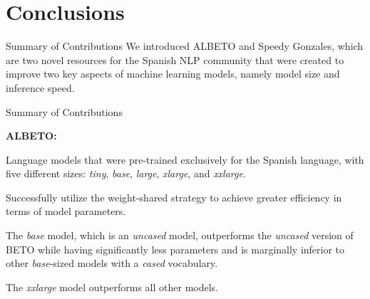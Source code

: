 \documentclass[aspectratio=169,xcolor=dvipsnames]{beamer}
\newenvironment{wideitemize}{\itemize\addtolength{\itemsep}{10pt}}{\enditemize}
\begin{document}




\section{Conclusions}
\begin{frame}{Summary of Contributions}
\centering
\Large{We introduced ALBETO and Speedy Gonzales, which are \alert{two novel resources} for the \alert{Spanish NLP} community that were created to \alert{improve} two key aspects of machine learning models, namely \alert{model size} and \alert{inference speed}.}

\end{frame}
\begin{frame}{Summary of Contributions}

\textbf{ALBETO:}
\begin{wideitemize}
    \item Language models that were pre-trained exclusively for the Spanish language, with five different sizes: \textit{tiny}, \textit{base}, \textit{large}, \textit{xlarge}, and \textit{xxlarge}.
    \item Successfully utilize the weight-shared strategy to achieve greater efficiency in terms of model parameters.
    \item The \textit{base} model, which is an \textit{uncased} model, outperforms the \textit{uncased} version of BETO while having significantly less parameters and is marginally inferior to other \textit{base}-sized models with a \textit{cased} vocabulary.
    \item The \textit{xxlarge} model outperforms all other models.
\end{wideitemize}

\end{frame}
\end{document}
